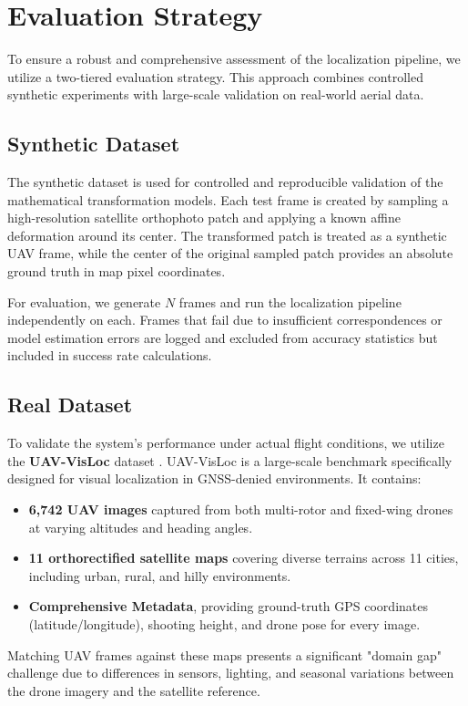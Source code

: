 \section{Evaluation Strategy}

To ensure a robust and comprehensive assessment of the localization pipeline, we utilize a two-tiered evaluation strategy. This approach combines controlled synthetic experiments with large-scale validation on real-world aerial data.

\subsection{Synthetic Dataset}
The synthetic dataset is used for controlled and reproducible validation of the mathematical transformation models. Each test frame is created by sampling a high-resolution satellite orthophoto patch and applying a known affine deformation around its center. The transformed patch is treated as a synthetic UAV frame, while the center of the original sampled patch provides an absolute ground truth in map pixel coordinates.

For evaluation, we generate $N$ frames and run the localization pipeline independently on each. Frames that fail due to insufficient correspondences or model estimation errors are logged and excluded from accuracy statistics but included in success rate calculations.

\subsection{Real Dataset}
To validate the system's performance under actual flight conditions, we utilize the \textbf{UAV-VisLoc} dataset \cite{uav_visloc}. UAV-VisLoc is a large-scale benchmark specifically designed for visual localization in GNSS-denied environments. It contains:
\begin{itemize}
    \item \textbf{6,742 UAV images} captured from both multi-rotor and fixed-wing drones at varying altitudes and heading angles.
    \item \textbf{11 orthorectified satellite maps} covering diverse terrains across 11 cities, including urban, rural, and hilly environments.
    \item \textbf{Comprehensive Metadata}, providing ground-truth GPS coordinates (latitude/longitude), shooting height, and drone pose for every image.
\end{itemize}
Matching UAV frames against these maps presents a significant "domain gap" challenge due to differences in sensors, lighting, and seasonal variations between the drone imagery and the satellite reference.

